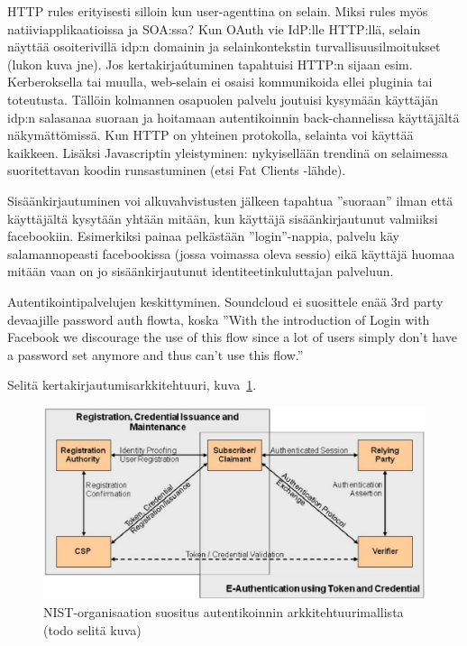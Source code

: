 \documentclass[finnish,gradu]{tktltiki}
\begin{document}
  HTTP rules erityisesti silloin kun user-agenttina on selain. Miksi rules myös natiiviapplikaatioissa ja SOA:ssa?
  Kun OAuth vie IdP:lle HTTP:llä, selain näyttää osoiterivillä idp:n domainin ja selainkontekstin turvallisuusilmoitukset (lukon kuva jne). Jos kertakirjaútuminen tapahtuisi HTTP:n sijaan esim. Kerberoksella tai muulla, web-selain ei osaisi kommunikoida ellei pluginia tai toteutusta. Tällöin kolmannen osapuolen palvelu joutuisi kysymään käyttäjän idp:n salasanaa suoraan ja hoitamaan autentikoinnin back-channelissa käyttäjältä näkymättömissä.
  Kun HTTP on yhteinen protokolla, selainta voi käyttää kaikkeen. Lisäksi Javascriptin yleistyminen: nykyisellään trendinä on selaimessa suoritettavan koodin runsastuminen (etsi Fat Clients -lähde).

  Sisäänkirjautuminen voi alkuvahvistusten jälkeen tapahtua ''suoraan'' ilman että käyttäjältä kysytään yhtään mitään, kun käyttäjä sisäänkirjautunut valmiiksi facebookiin. Esimerkiksi painaa pelkästään ''login''-nappia, palvelu käy salamannopeasti facebookissa (jossa voimassa oleva sessio) eikä käyttäjä huomaa mitään vaan on jo sisäänkirjautunut identiteetinkuluttajan palveluun.

  Autentikointipalvelujen keskittyminen. Soundcloud ei suosittele enää 3rd party devaajille password auth flowta, koska ''With the introduction of Login with Facebook we discourage the use of this flow since a lot of users simply don't have a password set anymore and thus can't use this flow.''

  Selitä kertakirjautumisarkkitehtuuri, kuva~\ref{fig:kertakirjautumisarkkitehtuurin_yleiskuva}.
  \begin{figure}
    \centering
    \includegraphics[width=1.0\textwidth]{images/NIST_authentication_architectural_model.jpg}
    \caption{NIST-organisaation suositus autentikoinnin arkkitehtuurimallista \cite{NIST_SP800-63-1} (todo selitä kuva) }
    \label{fig:kertakirjautumisarkkitehtuurin_yleiskuva}
  \end{figure}
\end{document}
